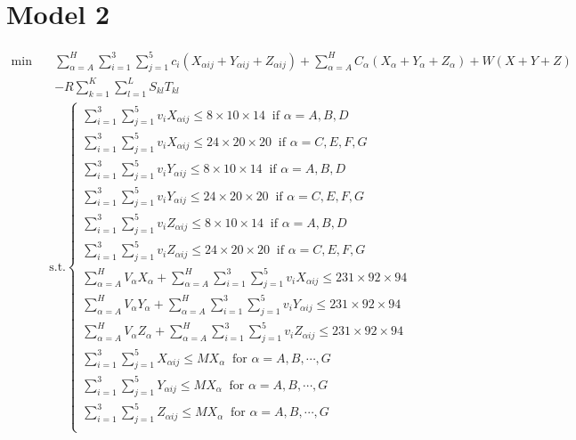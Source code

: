 \documentclass{mcmthesis}
\begin{document}
\section{Model 2}
\[
\begin{aligned}
\min\quad&\sum_{\alpha=A}^{H}\sum_{i=1}^{3}\sum_{j=1}^{5}c_{i}\left(X_{\alpha ij}+Y_{\alpha ij}+Z_{\alpha ij}\right)
+\sum_{\alpha=A}^{H}C_{{\alpha}}\left(X_{\alpha}+Y_{\alpha }+Z_{\alpha }\right)+W(X+Y+Z)\\
&-R\sum_{k=1}^{K}\sum_{l=1}^{L}S_{kl}T_{kl}
\end{aligned}
\]
\[
\begin{aligned}
\text{s.t.}
\left\{
\begin{array}{lr}
\sum\limits_{i=1}^{3}\sum\limits_{j=1}^{5}v_{i}X_{\alpha ij}\le 8\times 10\times 14\ \text{ if }\alpha=A,B,D \\
\sum\limits_{i=1}^{3}\sum\limits_{j=1}^{5}v_{i}X_{\alpha ij}\le 24\times 20\times 20\ \text{ if }\alpha=C,E,F,G \\
\sum\limits_{i=1}^{3}\sum\limits_{j=1}^{5}v_{i}Y_{\alpha ij}\le 8\times 10\times 14\ \text{ if }\alpha=A,B,D \\
\sum\limits_{i=1}^{3}\sum\limits_{j=1}^{5}v_{i}Y_{\alpha ij}\le 24\times 20\times 20\ \text{ if }\alpha=C,E,F,G \\
\sum\limits_{i=1}^{3}\sum\limits_{j=1}^{5}v_{i}Z_{\alpha ij}\le 8\times 10\times 14\ \text{ if }\alpha=A,B,D \\
\sum\limits_{i=1}^{3}\sum\limits_{j=1}^{5}v_{i}Z_{\alpha ij}\le 24\times 20\times 20\ \text{ if }\alpha=C,E,F,G \\
\sum\limits_{\alpha=A}^{H}V_{\alpha}X_{\alpha}+\sum\limits_{\alpha=A}^{H}\sum\limits_{i=1}^{3}\sum\limits_{j=1}^{5}v_{i}X_{\alpha ij}\le 231\times92\times 94\\
\sum\limits_{\alpha=A}^{H}V_{\alpha}Y_{\alpha}+\sum\limits_{\alpha=A}^{H}\sum\limits_{i=1}^{3}\sum\limits_{j=1}^{5}v_{i}Y_{\alpha ij}\le 231\times92\times 94\\
\sum\limits_{\alpha=A}^{H}V_{\alpha}Z_{\alpha}+\sum\limits_{\alpha=A}^{H}\sum\limits_{i=1}^{3}\sum\limits_{j=1}^{5}v_{i}Z_{\alpha ij}\le 231\times92\times 94\\
\sum\limits_{i=1}^{3}\sum\limits_{j=1}^{5}X_{\alpha ij}\le M X_{\alpha}\ \text{ for }\alpha=A,B,\cdots, G\\
\sum\limits_{i=1}^{3}\sum\limits_{j=1}^{5}Y_{\alpha ij}\le M X_{\alpha}\ \text{ for }\alpha=A,B,\cdots, G\\
\sum\limits_{i=1}^{3}\sum\limits_{j=1}^{5}Z_{\alpha ij}\le M X_{\alpha}\ \text{ for }\alpha=A,B,\cdots, G\\

\end{array}
\end{aligned}\]
\end{document}

